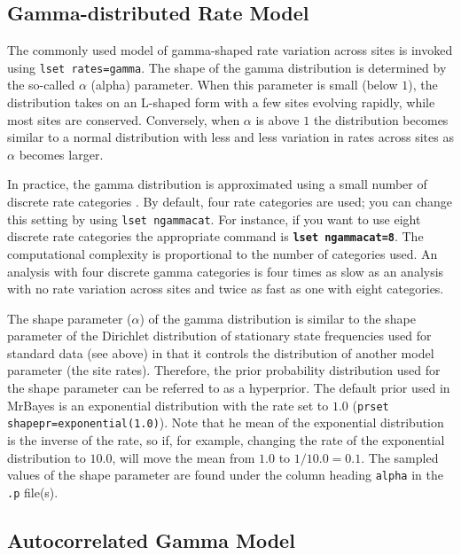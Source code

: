 \documentclass[12pt]{book}
\newcommand{\ttt}[1]{\texttt{#1}}
\newcommand{\tb}[1]{\ttt{\textbf{#1}}}
\begin{document}
\subsection{Gamma-distributed Rate Model}
\label{gammaDistributedRateModel}

The commonly used model of gamma-shaped rate variation across sites is invoked using \ttt{lset
rates=gamma}. The shape of the gamma distribution is determined by the so-called $\alpha$ (alpha)
parameter. When this parameter is small (below $1$), the distribution takes on an L-shaped form
with a few sites evolving rapidly, while most sites are conserved. Conversely, when $\alpha$ is
above $1$ the distribution becomes similar to a normal distribution with less and less variation in
rates across sites as $\alpha$ becomes larger.

In practice, the gamma distribution is approximated using a small number of discrete rate
categories \citep{yang94a}. By default, four rate categories are used; you can change this setting
by using \ttt{lset ngammacat}. For instance, if you want to use eight discrete rate categories the
appropriate command is \tb{lset ngammacat=8}. The computational complexity is proportional to the
number of categories used. An analysis with four discrete gamma categories is four times as slow as
an analysis with no rate variation across sites and twice as fast as one with eight categories.

The shape parameter ($\alpha$) of the gamma distribution is similar to the shape parameter of the
Dirichlet distribution of stationary state frequencies used for standard data (see above) in that
it controls the distribution of another model parameter (the site rates). Therefore, the prior
probability distribution used for the shape parameter can be referred to as a hyperprior. The
default prior used in MrBayes is an exponential distribution with the rate set to $1.0$ (\ttt{prset
shapepr=exponential(1.0)}). Note that he mean of the exponential distribution is the inverse of the
rate, so if, for example, changing the rate of the exponential distribution to $10.0$, will move
the mean from $1.0$ to $1/10.0 = 0.1$. The sampled values of the shape parameter are found under
the column heading \ttt{alpha} in the \ttt{.p} file(s).

\subsection{Autocorrelated Gamma Model}
\end{document}
